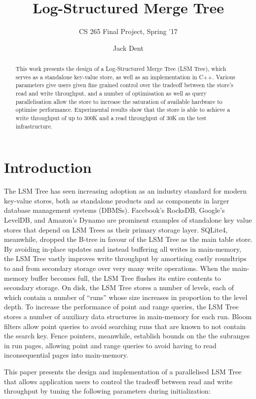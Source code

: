 \documentclass{acm}
\title{Log-Structured Merge Tree}
\subtitle{CS 265 Final Project, Spring '17}
\author{Jack Dent\\\email{jdent@college.harvard.edu}}
\begin{document}
\maketitle

\begin{abstract}
This work presents the design of a Log-Structured Merge Tree (LSM Tree), which serves as a standalone key-value store, as well as an implementation in C++. Various parameters give users given fine grained control over the tradeoff between the store's read and write throughput, and a number of optimisation as well as query parallelisation allow the store to increase the saturation of available hardware to optimise performance. Experimental results show that the store is able to achieve a write throughput of up to 300K and a read throughput of 30K on the test infrastructure.
\end{abstract}

\section{Introduction}

The LSM Tree has seen increasing adoption as an industry standard for modern key-value stores, both as standalone products and as components in larger database management systems (DBMSs). Facebook's RocksDB, Google's LevelDB, and Amazon's Dynamo are prominent examples of standalone key value stores that depend on LSM Trees as their primary storage layer. SQLite4, meanwhile, dropped the B-tree in favour of the LSM Tree as the main table store. By avoiding in-place updates and instead buffering all writes in main-memory, the LSM Tree vastly improves write throughput by amortising costly roundtrips to and from secondary storage over very many write operations. When the main-memory buffer becomes full, the LSM Tree flushes its entire contents to secondary storage. On disk, the LSM Tree stores a number of levels, each of which contain a number of ``runs'' whose size increases in proportion to the level depth. To increase the performance of point and range queries, the LSM Tree stores a number of auxiliary data structures in main-memory for each run. Bloom filters allow point queries to avoid searching runs that are known to not contain the search key. Fence pointers, meanwhile, establish bounds on the the subranges in run pages, allowing point and range queries to avoid having to read inconsequential pages into main-memory.

This paper presents the design and implementation of a parallelised LSM Tree that allows application users to control the tradeoff between read and write throughput by tuning the following parameters during initialization:
\end{document}
